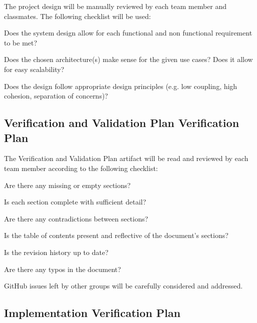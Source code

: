 \documentclass[12pt, titlepage]{article}
\begin{document}
	The project design will be manually reviewed by each team member and classmates. The following checklist will be used:
	\begin{todolist}
		\item Does the system design allow for each functional and non functional requirement to be met?
		\item Does the chosen architecture(s) make sense for the given use cases? Does it allow for easy scalability?
		\item Does the design follow appropriate design principles (e.g. low coupling, high cohesion, separation of concerns)?
	\end{todolist}
	
	\subsection{Verification and Validation Plan Verification Plan}

	The Verification and Validation Plan artifact will be read and reviewed by each team member according to the following checklist:
	\begin{todolist}
		\item Are there any missing or empty sections?
		\item Is each section complete with sufficient detail?
		\item Are there any contradictions between sections?
		\item Is the table of contents present and reflective of the document's sections?
		\item Is the revision history up to date?
		\item Are there any typos in the document?
	\end{todolist}
	GitHub issues left by other groups will be carefully considered and addressed.
	
	\subsection{Implementation Verification Plan}
	
	
\end{document}
